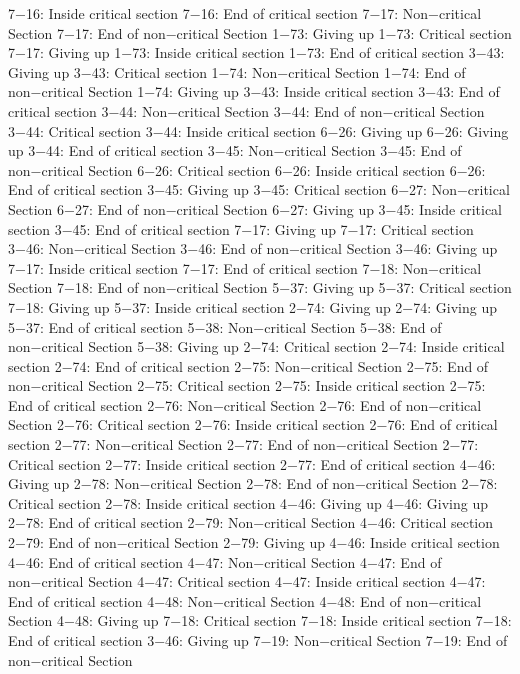 7−16: Inside critical section
7−16: End of critical section
7−17: Non−critical Section
7−17: End of non−critical Section
1−73: Giving up
1−73: Critical section
7−17: Giving up
1−73: Inside critical section
1−73: End of critical section
3−43: Giving up
3−43: Critical section
1−74: Non−critical Section
1−74: End of non−critical Section
1−74: Giving up
3−43: Inside critical section
3−43: End of critical section
3−44: Non−critical Section
3−44: End of non−critical Section
3−44: Critical section
3−44: Inside critical section
6−26: Giving up
6−26: Giving up
3−44: End of critical section
3−45: Non−critical Section
3−45: End of non−critical Section
6−26: Critical section
6−26: Inside critical section
6−26: End of critical section
3−45: Giving up
3−45: Critical section
6−27: Non−critical Section
6−27: End of non−critical Section
6−27: Giving up
3−45: Inside critical section
3−45: End of critical section
7−17: Giving up
7−17: Critical section
3−46: Non−critical Section
3−46: End of non−critical Section
3−46: Giving up
7−17: Inside critical section
7−17: End of critical section
7−18: Non−critical Section
7−18: End of non−critical Section
5−37: Giving up
5−37: Critical section
7−18: Giving up
5−37: Inside critical section
2−74: Giving up
2−74: Giving up
5−37: End of critical section
5−38: Non−critical Section
5−38: End of non−critical Section
5−38: Giving up
2−74: Critical section
2−74: Inside critical section
2−74: End of critical section
2−75: Non−critical Section
2−75: End of non−critical Section
2−75: Critical section
2−75: Inside critical section
2−75: End of critical section
2−76: Non−critical Section
2−76: End of non−critical Section
2−76: Critical section
2−76: Inside critical section
2−76: End of critical section
2−77: Non−critical Section
2−77: End of non−critical Section
2−77: Critical section
2−77: Inside critical section
2−77: End of critical section
4−46: Giving up
2−78: Non−critical Section
2−78: End of non−critical Section
2−78: Critical section
2−78: Inside critical section
4−46: Giving up
4−46: Giving up
2−78: End of critical section
2−79: Non−critical Section
4−46: Critical section
2−79: End of non−critical Section
2−79: Giving up
4−46: Inside critical section
4−46: End of critical section
4−47: Non−critical Section
4−47: End of non−critical Section
4−47: Critical section
4−47: Inside critical section
4−47: End of critical section
4−48: Non−critical Section
4−48: End of non−critical Section
4−48: Giving up
7−18: Critical section
7−18: Inside critical section
7−18: End of critical section
3−46: Giving up
7−19: Non−critical Section
7−19: End of non−critical Section
